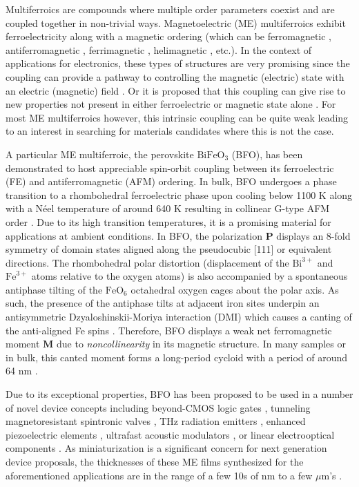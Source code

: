 \documentclass[%
 reprint,
superscriptaddress,
 amsmath,amssymb,
prb,
]{revtex4-1}
\begin{document}
%
Multiferroics are compounds where multiple order parameters coexist and are coupled together in non-trivial ways.
%
Magnetoelectric (ME) multiferroics exhibit ferroelectricity along with a magnetic ordering (which can be ferromagnetic \cite{Kezsmarki2015}, antiferromagnetic \cite{Heron2014}, ferrimagnetic \cite{Lin2017}, helimagnetic \cite{Seki2009}, etc.).
%
In the context of applications for electronics, these types of structures are very promising since the coupling can provide a pathway to controlling the magnetic (electric) state with an electric (magnetic) field \cite{Heron2014, Fiebig2016, Spaldin2019}.
%
Or it is proposed that this coupling can give rise to new properties not present in either ferroelectric or magnetic state alone \cite{Fiebig2016}.
%
For most ME multiferroics however, this intrinsic coupling can be quite weak leading to an interest in searching for materials candidates where this is not the case.
%

%
A particular ME multiferroic, the perovskite $\mathrm{BiFeO}_3$ (BFO), has been demonstrated to host appreciable spin-orbit coupling between its ferroelectric (FE) and antiferromagnetic (AFM) ordering.
%
In bulk, BFO undergoes a phase transition to a rhombohedral ferroelectric phase upon cooling below 1100 K \cite{Moreau1971,Smith1968} along with a N\'{e}el temperature of around 640 K resulting in collinear G-type AFM order \cite{Moreau1971}.
%
Due to its high transition temperatures, it is a promising material for applications at ambient conditions.
%
In BFO, the polarization \textbf{P} displays an 8-fold symmetry of domain states aligned along the pseudocubic [111] or equivalent directions.
%
The rhombohedral polar distortion (displacement of the $\mathrm{Bi}^{3+}$ and $\mathrm{Fe}^{3+}$ atoms relative to the oxygen atoms) is also accompanied by a spontaneous antiphase tilting of the $\mathrm{FeO}_6$ octahedral oxygen cages about the polar axis.
%
As such, the presence of the antiphase tilts at adjacent iron sites underpin an antisymmetric Dzyaloshinskii-Moriya interaction (DMI) which causes a canting of the anti-aligned Fe spins \cite{Ederer2005, Dixit2015}.
%
Therefore, BFO displays a weak net ferromagnetic moment $\mathbf{M}$ due to \emph{noncollinearity} in its magnetic structure.
%
In many samples or in bulk, this canted moment forms a long-period cycloid with a period of around 64 nm \cite{Sando2013, Agbelele2017, Burns2020, Xu2021}.
%


Due to its exceptional properties, BFO has been proposed to be used in a number of novel device concepts including beyond-CMOS logic gates \cite{Manipatruni2019, Parsonet2022}, tunneling magnetoresistant spintronic valves \cite{Bea2006, Fusil2014, Yin2018}, THz radiation emitters \cite{Takahashi2006, Guzelturk2020}, enhanced piezoelectric elements \cite{Paull2022, Heo2022}, ultrafast acoustic modulators \cite{Lejman2014}, or linear electrooptical components \cite{Zhu2016,Sando2014}.
%
As miniaturization is a significant concern for next generation device proposals, the thicknesses of these ME films synthesized for the aforementioned applications are in the range of a few 10s of nm to a few $\mu$m's \cite{Burns2020}. 
%
\end{document}
